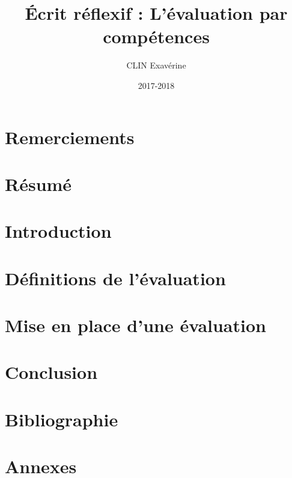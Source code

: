 \documentclass[a4paper, 12pt]{article}
\title{Écrit réflexif : L'évaluation par compétences}
\author{CLIN Exavérine}
\date{2017-2018}
\begin{document}
\maketitle
\thispagestyle{empty}

\newpage
\part*{Remerciements}


\newpage
\part*{Résumé}



\newpage
\tableofcontents

\newpage
\part{Introduction}


\newpage
\part{Définitions de l'évaluation}

\setcounter{section}{0}

\newpage
\part{Mise en place d'une évaluation}

\setcounter{section}{0}

%

\newpage
\part{Conclusion}


\newpage
\part*{Bibliographie}


\newpage
\part*{Annexes}
\end{document}
